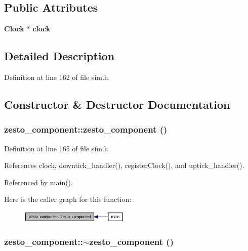 \subsection*{Public Attributes}
\begin{CompactItemize}
\item 
{\bf Clock} $\ast$ {\bf clock}
\end{CompactItemize}


\subsection{Detailed Description}


Definition at line 162 of file sim.h.

\subsection{Constructor \& Destructor Documentation}
\subsubsection[{zesto\_\-component}]{\setlength{\rightskip}{0pt plus 5cm}zesto\_\-component::zesto\_\-component ()\hspace{0.3cm}{\tt  [inline]}}\label{classzesto__component_74c85ea8b1296c7eb0c17ddb7c4b11c4}




Definition at line 165 of file sim.h.

References clock, downtick\_\-handler(), registerClock(), and uptick\_\-handler().

Referenced by main().

Here is the caller graph for this function:\nopagebreak
\begin{figure}[H]
\begin{center}
\leavevmode
\includegraphics[width=148pt]{classzesto__component_74c85ea8b1296c7eb0c17ddb7c4b11c4_icgraph}
\end{center}
\end{figure}
\subsubsection[{$\sim$zesto\_\-component}]{\setlength{\rightskip}{0pt plus 5cm}zesto\_\-component::$\sim$zesto\_\-component ()\hspace{0.3cm}{\tt  [inline]}}\label{classzesto__component_1b8e9eecf1b3275a3a711f52063bfb44}




